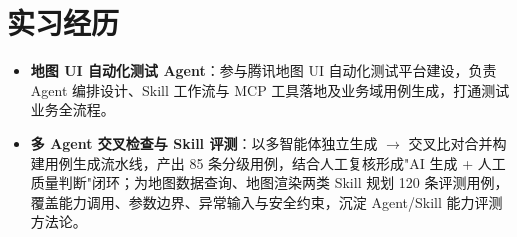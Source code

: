 \documentclass[10pt]{article}
\begin{document}

    \section[实习经历]{\makebox[\iconwidth][c]{\color{primarycolor}{\faBriefcase}}\quad 实习经历}

    \begin{itemize}
        \item \textbf{地图 UI 自动化测试 Agent}：参与腾讯地图 UI 自动化测试平台建设，负责 Agent 编排设计、Skill 工作流与 MCP 工具落地及业务域用例生成，打通测试业务全流程。
        \item \textbf{多 Agent 交叉检查与 Skill 评测}：以多智能体独立生成 $\rightarrow$ 交叉比对合并构建用例生成流水线，产出 85 条分级用例，结合人工复核形成"AI 生成 + 人工质量判断"闭环；为地图数据查询、地图渲染两类 Skill 规划 120 条评测用例，覆盖能力调用、参数边界、异常输入与安全约束，沉淀 Agent/Skill 能力评测方法论。
    \end{itemize}


\end{document}
